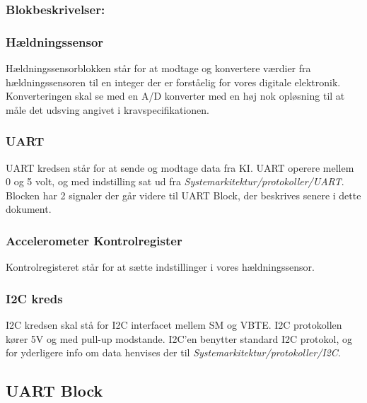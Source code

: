 \subsubsection{Blokbeskrivelser:}
\subsubsection{Hældningssensor}
Hældningssensorblokken står for at modtage og konvertere værdier fra hældningssensoren til en integer der er forståelig for vores digitale elektronik. Konverteringen skal se med en A/D konverter med en høj nok opløsning til at måle det udsving angivet i kravspecifikationen.
\subsubsection{UART}
UART kredsen står for at sende og modtage data fra KI. UART operere mellem 0 og 5 volt, og med indstilling sat ud fra \textit{Systemarkitektur/protokoller/UART}. Blocken har 2 signaler der går videre til UART Block, der beskrives senere i dette dokument. 
\subsubsection{Accelerometer Kontrolregister}
Kontrolregisteret står for at sætte indstillinger i vores hældningssensor.
\subsubsection{I2C kreds}
I2C kredsen skal stå for I2C interfacet mellem SM og VBTE. I2C protokollen kører 5V og med pull-up modstande. I2C'en benytter standard I2C protokol, og for yderligere info om data henvises der til \textit{Systemarkitektur/protokoller/I2C}.
\subsection{UART Block}
